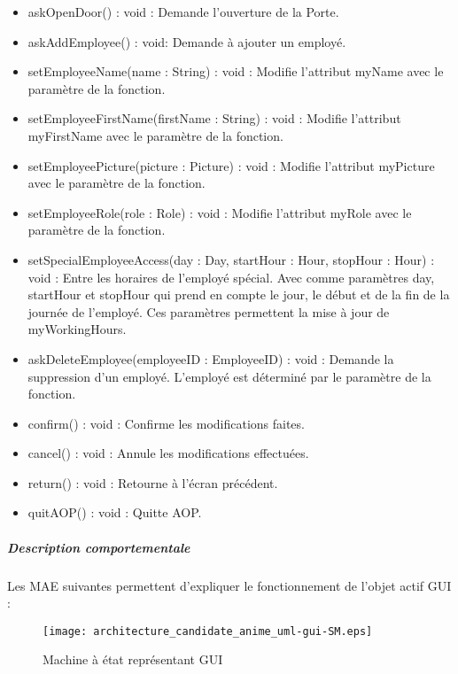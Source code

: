 \begin{itemize}
                \item askOpenDoor() : void : Demande l'ouverture de la Porte.
                \item askAddEmployee() : void: Demande à ajouter un employé.
                \item setEmployeeName(name : String) : void : Modifie l’attribut myName avec le paramètre de la fonction.
                \item setEmployeeFirstName(firstName : String) : void :  Modifie l’attribut myFirstName avec le paramètre de la fonction.
                \item setEmployeePicture(picture : Picture) : void : Modifie l’attribut myPicture avec le paramètre de la fonction.
                \item setEmployeeRole(role : Role) : void : Modifie l’attribut myRole avec le paramètre de la fonction.
                \item setSpecialEmployeeAccess(day : Day, startHour : Hour, stopHour : Hour) : void : Entre les horaires de l'employé spécial.
                Avec comme paramètres day, startHour et stopHour qui prend en compte le jour, le début et de la fin de la journée de l'employé.
                Ces paramètres permettent la mise à jour de myWorkingHours.
                \item askDeleteEmployee(employeeID : EmployeeID) : void : Demande la suppression d'un employé. L'employé est déterminé par le paramètre de la fonction.
                \item confirm() : void : Confirme les modifications faites.
                \item cancel() : void : Annule les modifications effectuées.
                \item return() : void : Retourne à l'écran précédent.
                \item quitAOP() : void : Quitte AOP.
            \end{itemize}    
            
        \subparagraph{Description comportementale}%
        Les MAE suivantes permettent d'expliquer le fonctionnement de l'objet actif GUI :
        \begin{figure} [H]
            \centering
            \texttt{[image: architecture\_candidate\_anime\_uml-gui-SM.eps]}
            \caption{Machine à état représentant GUI}
            \label{MaE_connexion_GUI}
        \end{figure}

